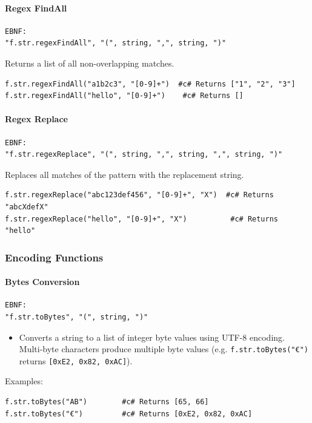 \paragraph{Regex FindAll}
\begin{verbatim}
EBNF:
"f.str.regexFindAll", "(", string, ",", string, ")"
\end{verbatim}
Returns a list of all non-overlapping matches.
\begin{verbatim}
f.str.regexFindAll("a1b2c3", "[0-9]+")  #c# Returns ["1", "2", "3"]
f.str.regexFindAll("hello", "[0-9]+")    #c# Returns []
\end{verbatim}

\paragraph{Regex Replace}
\begin{verbatim}
EBNF:
"f.str.regexReplace", "(", string, ",", string, ",", string, ")"
\end{verbatim}
Replaces all matches of the pattern with the replacement string.
\begin{verbatim}
f.str.regexReplace("abc123def456", "[0-9]+", "X")  #c# Returns "abcXdefX"
f.str.regexReplace("hello", "[0-9]+", "X")          #c# Returns "hello"
\end{verbatim}

\subsubsection{Encoding Functions}
\paragraph{Bytes Conversion}
\begin{verbatim}
EBNF:
"f.str.toBytes", "(", string, ")"
\end{verbatim}
\begin{itemize}
\item Converts a string to a list of integer byte values using UTF-8 encoding. Multi-byte characters produce multiple byte values (e.g. \texttt{f.str.toBytes("€")} returns \texttt{[0xE2, 0x82, 0xAC]}).
\end{itemize}
Examples:
\begin{verbatim}
f.str.toBytes("AB")        #c# Returns [65, 66]
f.str.toBytes("€")         #c# Returns [0xE2, 0x82, 0xAC]
\end{verbatim}

